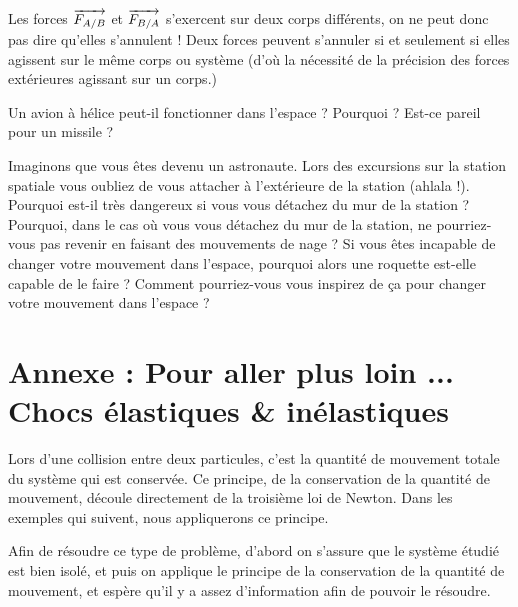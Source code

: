 \documentclass[11pt,a4paper]{article}
\begin{document}
\endgroup	

\begin{rmrq}
Les forces $\overrightarrow{F_{A/B}}$  et $\overrightarrow{F_{B/A}}$  s’exercent sur deux corps différents, on ne peut donc pas dire qu’elles s’annulent ! Deux forces peuvent s’annuler si et seulement si elles agissent sur le même corps ou système (d’où la nécessité de la précision des forces extérieures agissant sur un corps.) 
\end{rmrq}
	
\begin{exo}
    Un avion à hélice peut-il fonctionner dans l’espace ? Pourquoi ? Est-ce pareil pour un missile ?
    \vspace{3cm}
\end{exo}  
	
\begin{exo}
Imaginons que vous êtes devenu un astronaute. Lors des excursions sur la station spatiale vous oubliez de vous attacher à l’extérieure de la station (ahlala !). Pourquoi est-il très dangereux si vous vous détachez du mur de la station ? Pourquoi, dans le cas où vous vous détachez du mur de la station, ne pourriez-vous pas revenir en faisant des mouvements de nage ? Si vous êtes incapable de changer votre mouvement dans l’espace, pourquoi alors une roquette est-elle capable de le faire ? Comment pourriez-vous vous inspirez de ça pour changer votre mouvement dans l’espace ? 
    \vspace{5cm}
\end{exo} 
\vfill
\section{Annexe : Pour aller plus loin ... Chocs élastiques \& inélastiques}

Lors d'une collision entre deux particules, c'est la quantité de mouvement totale du système qui est conservée. Ce principe, de la conservation de la quantité de mouvement, découle directement de la troisième loi de Newton. Dans les exemples qui suivent, nous appliquerons ce principe.

Afin de résoudre ce type de problème, d'abord on s'assure que le système étudié est bien isolé, et puis on applique le principe de la conservation de la quantité de mouvement, et espère qu'il y a assez d'information afin de pouvoir le résoudre. 
\end{document}
